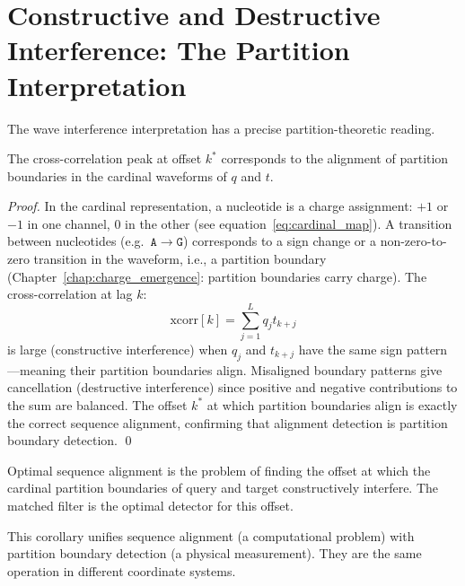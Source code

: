 \section{Constructive and Destructive Interference: The Partition Interpretation}
\label{sec:partition_interference}

The wave interference interpretation has a precise partition-theoretic reading.

\begin{proposition}[Constructive Interference = Partition Boundary Alignment]
\label{prop:constructive_interference}
The cross-correlation peak at offset $k^*$ corresponds to the alignment of
partition boundaries in the cardinal waveforms of $q$ and $t$.
\end{proposition}

\begin{proof}
In the cardinal representation, a nucleotide is a charge assignment: $+1$ or
$-1$ in one channel, $0$ in the other (see equation~\eqref{eq:cardinal_map}).
A transition between nucleotides (e.g.\ $\mathtt{A} \to \mathtt{G}$) corresponds
to a sign change or a non-zero-to-zero transition in the waveform, i.e., a
partition boundary (Chapter~\ref{chap:charge_emergence}: partition boundaries
carry charge). The cross-correlation at lag $k$:
\begin{equation}
  \mathrm{xcorr}[k] = \sum_{j=1}^L q_j t_{k+j}
\end{equation}
is large (constructive interference) when $q_j$ and $t_{k+j}$ have the same
sign pattern---meaning their partition boundaries align. Misaligned boundary
patterns give cancellation (destructive interference) since positive and
negative contributions to the sum are balanced. The offset $k^*$ at which
partition boundaries align is exactly the correct sequence alignment, confirming
that alignment detection is partition boundary detection. \qed
\end{proof}

\begin{corollary}[Sequence Alignment = Partition Boundary Detection]
\label{cor:alignment_boundary}
Optimal sequence alignment is the problem of finding the offset at which
the cardinal partition boundaries of query and target constructively interfere.
The matched filter is the optimal detector for this offset.
\end{corollary}

This corollary unifies sequence alignment (a computational problem) with
partition boundary detection (a physical measurement). They are the same
operation in different coordinate systems.

